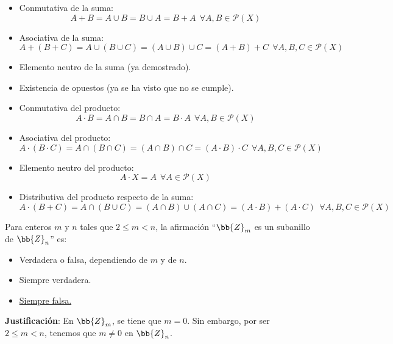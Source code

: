 \documentclass[12pt]{article}
\newcounter{ejercicio}[section] %
\newcounter{ejercicio}
\begin{document}
\begin{ejercicio}
        \begin{itemize}
            \item Conmutativa de la suma:
            $$A + B = A \cup B = B \cup A = B + A~~\forall A,B \in \mathcal{P}(X)$$
            \item Asociativa de la suma:
            $$A + (B + C) = A \cup (B \cup C) = (A \cup B) \cup C = (A+B)+C~~\forall A,B,C \in \mathcal{P}(X)$$
            \item Elemento neutro de la suma (ya demostrado).
            \item Existencia de opuestos (ya se ha visto que no se cumple).
            \item Conmutativa del producto:
            $$A \cdot B = A \cap B = B \cap A = B \cdot A~~\forall A,B \in \mathcal{P}(X)$$
            \item Asociativa del producto:
            $$A \cdot (B \cdot C) = A \cap (B \cap C) = (A \cap B) \cap C = (A\cdot B)\cdot C~~\forall A,B,C \in \mathcal{P}(X)$$
            \item Elemento neutro del producto:
                $$A \cdot X = A~~\forall A \in \mathcal{P}(X)$$
            \item Distributiva del producto respecto de la suma:
                $$A \cdot (B + C) = A \cap (B \cup C) = (A \cap B) \cup (A \cap C) = (A \cdot B) +(A\cdot C)~~\forall A,B,C \in \mathcal{P}(X)$$
        \end{itemize}
    \end{ejercicio}

    \begin{ejercicio}
        Para enteros $m$ y $n$ tales que $2 \leq m < n$, la afirmación ``$\bb{Z}_m$ es un subanillo de $\bb{Z}_n$'' es:
        \begin{itemize}
            \item Verdadera o falsa, dependiendo de $m$ y de $n$.
            \item Siempre verdadera.
            \item \underline{Siempre falsa.}
        \end{itemize}

        \noindent
        \textbf{Justificación}:
        En $\bb{Z}_m$, se tiene que $m = 0$.\newline
        Sin embargo, por ser $2 \leq m < n$, tenemos que $m \neq 0$ en $\bb{Z}_n$.
    \end{ejercicio}
\end{document}
